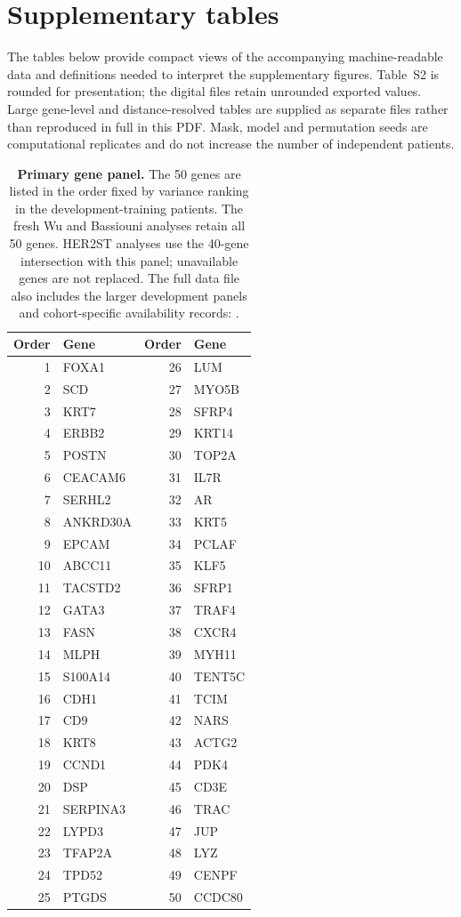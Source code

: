 \section{Supplementary tables}
The tables below provide compact views of the accompanying machine-readable data and definitions needed to interpret the supplementary figures. Table~S2 is rounded for presentation; the digital files retain unrounded exported values. Large gene-level and distance-resolved tables are supplied as separate files rather than reproduced in full in this PDF. Mask, model and permutation seeds are computational replicates and do not increase the number of independent patients.
\begin{table}[htbp]
\caption{\textbf{Primary gene panel.} The 50 genes are listed in the order fixed by variance ranking in the development-training patients. The fresh Wu and Bassiouni analyses retain all 50 genes. HER2ST analyses use the 40-gene intersection with this panel; unavailable genes are not replaced. The full data file also includes the larger development panels and cohort-specific availability records: \protect{}.}
\centering\small
\begin{tabular}{rlrl}\toprule
Order & Gene & Order & Gene\\\midrule
1 & FOXA1 & 26 & LUM \\
2 & SCD & 27 & MYO5B \\
3 & KRT7 & 28 & SFRP4 \\
4 & ERBB2 & 29 & KRT14 \\
5 & POSTN & 30 & TOP2A \\
6 & CEACAM6 & 31 & IL7R \\
7 & SERHL2 & 32 & AR \\
8 & ANKRD30A & 33 & KRT5 \\
9 & EPCAM & 34 & PCLAF \\
10 & ABCC11 & 35 & KLF5 \\
11 & TACSTD2 & 36 & SFRP1 \\
12 & GATA3 & 37 & TRAF4 \\
13 & FASN & 38 & CXCR4 \\
14 & MLPH & 39 & MYH11 \\
15 & S100A14 & 40 & TENT5C \\
16 & CDH1 & 41 & TCIM \\
17 & CD9 & 42 & NARS \\
18 & KRT8 & 43 & ACTG2 \\
19 & CCND1 & 44 & PDK4 \\
20 & DSP & 45 & CD3E \\
21 & SERPINA3 & 46 & TRAC \\
22 & LYPD3 & 47 & JUP \\
23 & TFAP2A & 48 & LYZ \\
24 & TPD52 & 49 & CENPF \\
25 & PTGDS & 50 & CCDC80 \\
\bottomrule\end{tabular}\end{table}\clearpage
